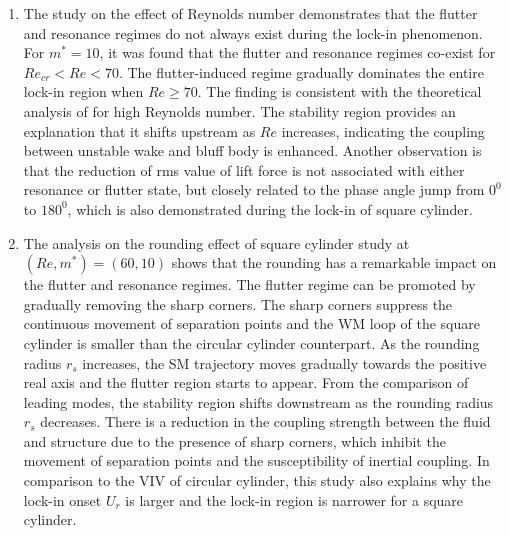 \documentclass{jfm}
\begin{document}
\begin{enumerate}
\item{
The study on the effect of Reynolds number demonstrates
that the flutter and resonance regimes do not always exist during the lock-in phenomenon. 
For $m^*=10$, it was found that the flutter and resonance regimes 
co-exist for $Re_{cr} < Re < 70$. 
The flutter-induced regime gradually dominates the entire lock-in region 
when $Re \ge 70$. The finding is consistent 
with the theoretical analysis of \cite{DeLangre2006} for high Reynolds number. 
The stability region provides an explanation that it shifts upstream as $Re$ increases,
indicating the coupling between unstable wake and bluff body is enhanced. 
Another observation is that the reduction of rms value of lift force 
is not associated with either resonance or flutter state, but closely related to the 
phase angle jump from $0^0$ to $180^0$, which is also demonstrated during the lock-in of
square cylinder.}

\item{ 
The analysis on the rounding effect of square cylinder study at $(Re,m^*)=(60,10)$ 
shows that the rounding 
has a remarkable impact on the flutter and resonance regimes.
The flutter regime can be promoted by gradually removing the sharp corners. 
The sharp corners suppress the continuous movement of separation points and 
the WM loop of the square cylinder is smaller than the circular cylinder counterpart.
As the rounding radius $r_s$ increases, the SM trajectory moves gradually towards the 
positive real axis and the flutter region starts to appear. From the comparison of 
leading modes, the stability region shifts downstream as the rounding radius $r_s$ decreases.
There is a reduction in the coupling strength between the fluid and structure due to 
the presence of sharp corners, which inhibit the movement of separation points 
and the susceptibility of inertial coupling. In comparison to the VIV of circular cylinder, 
this study also explains why the lock-in onset $U_r$ is larger and the lock-in region is narrower for a square cylinder.   
}


\end{enumerate}
\end{document}
